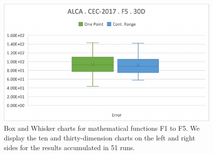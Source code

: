 \documentclass[graybox]{svmult}
\begin{document}
\begin{figure}[!ht]
\begin{minipage}[h]{0.49\linewidth}
        \end{minipage}
        \hfill
        \begin{minipage}[h]{0.49\linewidth}
            \includegraphics[width=1\linewidth]{img/fig_experiment_F5x30D.pdf} 
        \end{minipage}       
        
        \caption{Box and Whisker charts for mathematical functions F1 to F5. We display the ten and thirty-dimension charts on the left and right sides for the results accumulated in 51 runs.} \label{fig.experiment_F1-F5}
    \end{figure}

    \FloatBarrier
\end{document}

